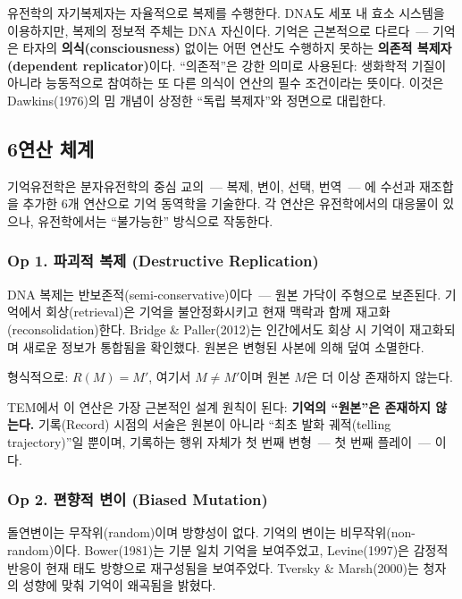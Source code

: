 \documentclass[11pt, a4paper]{article}
\begin{document}
유전학의 자기복제자는 자율적으로 복제를 수행한다. DNA도 세포 내 효소 시스템을 이용하지만, 복제의 정보적 주체는 DNA 자신이다. 기억은 근본적으로 다르다~--- 기억은 타자의 \textbf{의식(consciousness)} 없이는 어떤 연산도 수행하지 못하는 \textbf{의존적 복제자(dependent replicator)}이다. ``의존적''은 강한 의미로 사용된다: 생화학적 기질이 아니라 능동적으로 참여하는 또 다른 의식이 연산의 필수 조건이라는 뜻이다. 이것은 Dawkins(1976)의 밈 개념이 상정한 ``독립 복제자''와 정면으로 대립한다.

\subsection{6연산 체계}

기억유전학은 분자유전학의 중심 교의~--- 복제, 변이, 선택, 번역~--- 에 수선과 재조합을 추가한 6개 연산으로 기억 동역학을 기술한다. 각 연산은 유전학에서의 대응물이 있으나, 유전학에서는 ``불가능한'' 방식으로 작동한다.

\subsubsection{Op 1. 파괴적 복제 (Destructive Replication)}

DNA 복제는 반보존적(semi-conservative)이다~--- 원본 가닥이 주형으로 보존된다. 기억에서 회상(retrieval)은 기억을 불안정화시키고 현재 맥락과 함께 재고화(reconsolidation)한다\cite{nader2000}. Bridge \& Paller(2012)는 인간에서도 회상 시 기억이 재고화되며 새로운 정보가 통합됨을 확인했다\cite{bridge2012}. 원본은 변형된 사본에 의해 덮여 소멸한다.

형식적으로: $R(M) = M'$, 여기서 $M \neq M'$이며 원본 $M$은 더 이상 존재하지 않는다.

TEM에서 이 연산은 가장 근본적인 설계 원칙이 된다: \textbf{기억의 ``원본''은 존재하지 않는다.} 기록(Record) 시점의 서술은 원본이 아니라 ``최초 발화 궤적(telling trajectory)''일 뿐이며, 기록하는 행위 자체가 첫 번째 변형~--- 첫 번째 플레이~--- 이다.

\subsubsection{Op 2. 편향적 변이 (Biased Mutation)}

돌연변이는 무작위(random)이며 방향성이 없다. 기억의 변이는 비무작위(non-random)이다. Bower(1981)는 기분 일치 기억을 보여주었고\cite{bower1981}, Levine(1997)은 감정적 반응이 현재 태도 방향으로 재구성됨을 보여주었다\cite{levine1997}. Tversky \& Marsh(2000)는 청자의 성향에 맞춰 기억이 왜곡됨을 밝혔다\cite{tversky2000}.
\end{document}
